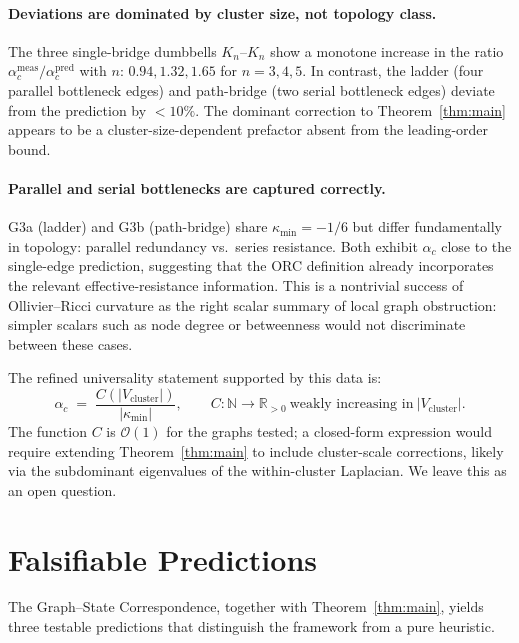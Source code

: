 \documentclass[11pt,letterpaper]{article}
\theoremstyle{definition}
\theoremstyle{remark}
\begin{document}
\paragraph{Deviations are dominated by cluster size, not topology class.}
The three single-bridge dumbbells $K_n$--$K_n$ show a monotone increase in
the ratio $\alpha_c^{\mathrm{meas}}/\alpha_c^{\mathrm{pred}}$ with $n$:
$0.94, 1.32, 1.65$ for $n = 3,4,5$. In contrast, the ladder
(four parallel bottleneck edges) and path-bridge (two serial bottleneck edges)
deviate from the prediction by $<10\%$. The dominant correction to
Theorem~\ref{thm:main} appears to be a cluster-size-dependent prefactor
absent from the leading-order bound.

\paragraph{Parallel and serial bottlenecks are captured correctly.}
G3a (ladder) and G3b (path-bridge) share $\kappa_{\min} = -1/6$ but differ
fundamentally in topology: parallel redundancy vs.\ series resistance.
Both exhibit $\alpha_c$ close to the single-edge prediction, suggesting
that the ORC definition already incorporates the relevant effective-resistance
information. This is a nontrivial success of Ollivier--Ricci curvature as
the right scalar summary of local graph obstruction: simpler scalars such
as node degree or betweenness would not discriminate between these cases.

The refined universality statement supported by this data is:
\begin{equation}
\alpha_c \;=\; \frac{C(|V_{\mathrm{cluster}}|)}{|\kappa_{\min}|},
\qquad C : \mathbb{N} \to \mathbb{R}_{>0}\ \text{weakly increasing in}\ |V_{\mathrm{cluster}}|.
\label{eq:refined_universality}
\end{equation}
The function $C$ is $\mathcal{O}(1)$ for the graphs tested; a closed-form
expression would require extending Theorem~\ref{thm:main} to include
cluster-scale corrections, likely via the subdominant eigenvalues of the
within-cluster Laplacian. We leave this as an open question.

\section{Falsifiable Predictions}
\label{sec:predictions}

The Graph--State Correspondence, together with Theorem~\ref{thm:main}, yields
three testable predictions that distinguish the framework from a pure
heuristic.
\end{document}
